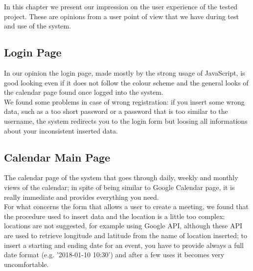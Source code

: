 In this chapter we present our impression on the user experience of the tested project. These are opinions from a user point of view that we have during test and use of the system.

\subsection{Login Page}
In our opinion the login page, made mostly by the strong usage of JavaScript, is good looking even if it does not follow the colour scheme and the general looks of the calendar page found once logged into the system. \\
We found some problems in case of wrong registration: if you insert some wrong data, such as a too short password or a password that is too similar to the username, the system redirects you to the login form but loosing all informations about your inconsistent inserted data.

\subsection{Calendar Main Page}
The calendar page of the system that goes through daily, weekly and monthly views of the calendar; in spite of being similar to Google Calendar page, it is really immediate and provides everything you need. \\
For what concerns the form that allows a user to create a meeting, we found that the procedure used to insert data and the location is a little too complex: locations are not suggested, for example using Google API, although these API are used to retrieve longitude and latitude from the name of location inserted; to insert a starting and ending date for an event, you have to provide always a full date format (e.g. '2018-01-10 10:30') and after a few uses it becomes very uncomfortable.

